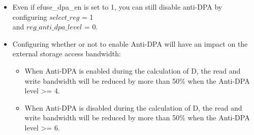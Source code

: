 \documentclass[main\_\_EN.tex]{subfiles}
\begin{document}
\begin{tiplisting}
\vspace{-2.5em}
    \begin{itemize}
        \item Even if efuse\_dpa\_en is set to 1, you can still disable anti-DPA by configuring $select\_reg$ = 1 \\ and $reg\_anti\_dpa\_level$ = 0.
        \item Configuring whether or not to enable Anti-DPA will have an impact on the external storage access bandwidth:
            \begin{itemize}
                \item When Anti-DPA is enabled during the calculation of D, the read and write bandwidth will be reduced by more than 50\% when the Anti-DPA level >= 4.
                \item When Anti-DPA is disabled during the calculation of D, the read and write bandwidth will be reduced by more than 50\% when the Anti-DPA level >= 6.
            \end{itemize}
    \end{itemize}
\end{tiplisting}
\end{document}
